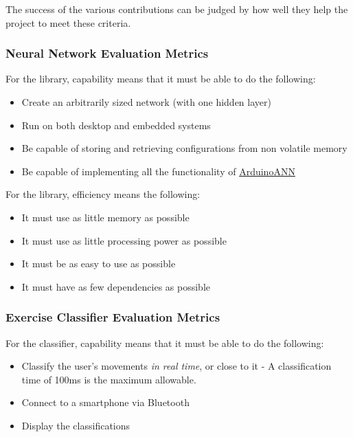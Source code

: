 \documentclass[a4paper]{article}
\begin{document}
The success of the various contributions can be judged by how well they help the project to meet these criteria.

\subsubsection{Neural Network Evaluation Metrics}
\label{subsubsec:in_cs_nnmetrics}

For the library, capability means that it must be able to do the following:

\begin{itemize}
\item Create an arbitrarily sized network (with one hidden layer)
\item Run on both desktop and embedded systems
\item Be capable of storing and retrieving configurations from non volatile memory
\item Be capable of implementing all the functionality of \hyperref[subsec:bg_arduinoann]{ArduinoANN}
\end{itemize}

For the library, efficiency means the following:

\begin{itemize}
\item It must use as little memory as possible
\item It must use as little processing power as possible
\item It must be as easy to use as possible
\item It must have as few dependencies as possible
\end{itemize}

\subsubsection{Exercise Classifier Evaluation Metrics}
\label{subsubsec:in_cs_ecmetrics}

For the classifier, capability means that it must be able to do the following:

\begin{itemize}
\item Classify the user's movements \textit{in real time}, or close to it - A classification time of 100ms is the maximum allowable.
\item Connect to a smartphone via Bluetooth
\item Display the classifications
\end{itemize}
\end{document}
